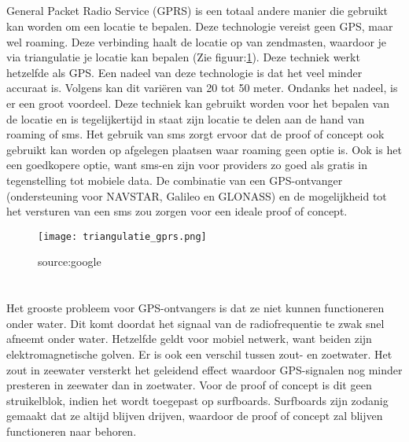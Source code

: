 \subsection{}
General Packet Radio Service (GPRS) is een totaal andere manier die gebruikt kan worden  om een locatie te bepalen. Deze technologie vereist geen GPS, maar wel roaming. Deze verbinding haalt de locatie op van zendmasten, waardoor je via triangulatie je locatie kan bepalen (Zie figuur:\ref{fig:triangulatie_gprs}). Deze techniek werkt hetzelfde als GPS.
\newline
Een nadeel van deze technologie is dat het veel minder accuraat is. Volgens \cite{gprs} kan dit variëren van 20 tot 50 meter. Ondanks het nadeel, is er een groot voordeel. Deze techniek kan gebruikt worden voor het bepalen van de locatie en is tegelijkertijd in staat zijn locatie te delen aan de hand van roaming of sms. Het gebruik van sms zorgt ervoor dat de proof of concept ook gebruikt kan worden op afgelegen plaatsen waar roaming geen optie is. Ook is het een goedkopere optie, want sms-en zijn voor providers zo goed als gratis in tegenstelling tot mobiele data. De combinatie van een GPS-ontvanger (ondersteuning voor NAVSTAR, Galileo en GLONASS) en de mogelijkheid tot het versturen van een sms zou zorgen voor een ideale proof of concept. 
\begin{figure}
    \texttt{[image: triangulatie\_gprs.png]}
    \caption{source:google}
    \label{fig:triangulatie_gprs}
\end{figure}
\pagebreak
\section{}
\subsection{}
Het grooste probleem voor GPS-ontvangers is dat ze niet kunnen functioneren onder water. Dit komt doordat het signaal van de radiofrequentie te zwak snel afneemt onder water. Hetzelfde geldt voor mobiel netwerk, want beiden zijn elektromagnetische golven. \autocite{underwater} Er is ook een verschil tussen zout- en zoetwater. Het zout in zeewater versterkt het geleidend effect waardoor GPS-signalen nog minder presteren in zeewater dan in zoetwater. Voor de proof of concept is dit geen struikelblok, indien het wordt toegepast op surfboards. Surfboards zijn zodanig gemaakt dat ze altijd blijven drijven, waardoor de proof of concept zal blijven functioneren naar behoren.
